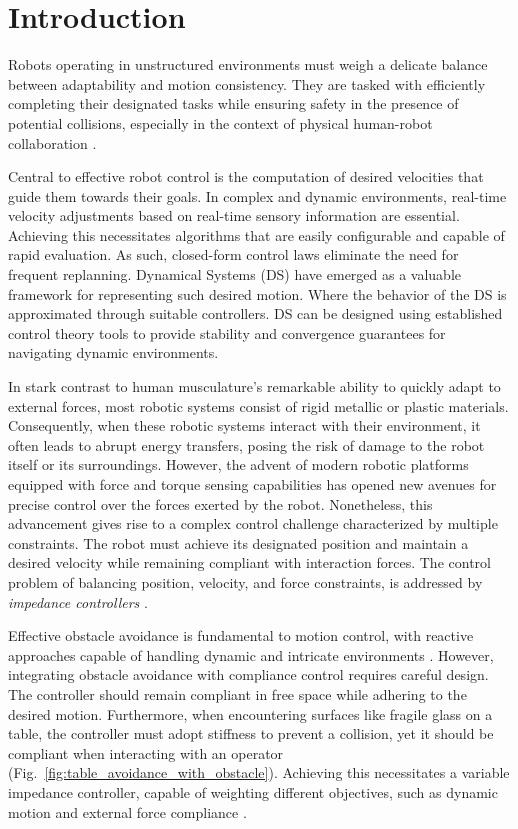\section{Introduction}
Robots operating in unstructured environments must weigh a delicate balance between adaptability and motion consistency. They are tasked with efficiently completing their designated tasks while ensuring safety in the presence of potential collisions, especially in the context of physical human-robot collaboration \parencite{ajoudani2018progress}.

Central to effective robot control is the computation of desired velocities that guide them towards their goals. In complex and dynamic environments, real-time velocity adjustments based on real-time sensory information are essential. Achieving this necessitates algorithms that are easily configurable and capable of rapid evaluation. As such, closed-form control laws eliminate the need for frequent replanning. Dynamical Systems (DS) have emerged as a valuable framework for representing such desired motion. Where the behavior of the DS is approximated through suitable controllers. DS can be designed using established control theory tools to provide stability and convergence guarantees for navigating dynamic environments.

In stark contrast to human musculature's remarkable ability to quickly adapt to external forces, most robotic systems consist of rigid metallic or plastic materials. Consequently, when these robotic systems interact with their environment, it often leads to abrupt energy transfers, posing the risk of damage to the robot itself or its surroundings. However, the advent of modern robotic platforms equipped with force and torque sensing capabilities has opened new avenues for precise control over the forces exerted by the robot.
Nonetheless, this advancement gives rise to a complex control challenge characterized by multiple constraints. The robot must achieve its designated position and maintain a desired velocity while remaining compliant with interaction forces. The control problem of balancing position, velocity, and force constraints, is addressed by \textit{impedance controllers} \parencite{takegaki1981new, hogan1984impedance}.

Effective obstacle avoidance is fundamental to motion control, with reactive approaches capable of handling dynamic and intricate environments \parencite{huber2019avoidance}. However, integrating obstacle avoidance with compliance control requires careful design. The controller should remain compliant in free space while adhering to the desired motion. Furthermore, when encountering surfaces like fragile glass on a table, the controller must adopt stiffness to prevent a collision, yet it should be compliant when interacting with an operator (Fig.~\ref{fig:table_avoidance_with_obstacle}). Achieving this necessitates a variable impedance controller, capable of weighting different objectives, such as dynamic motion and external force compliance \parencite{kronander2015passive}.

